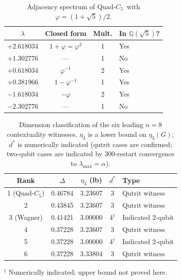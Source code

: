 \documentclass[aps,pra,twocolumn,superscriptaddress,longbibliography,floatfix]{revtex4-2}
\newcommand{\al}{\alpha}
\newcommand{\De}{\Delta}
\newcommand{\lmax}{\lambda_{\max}}
\newcommand{\QC}{\ensuremath{\text{Quad-}C_5}}
\begin{document}
\begin{table}[!ht]
  \caption{Adjacency spectrum of \QC\ with $\varphi=(1+\sqrt{5})/2$.}
  \label{tab:spectrum}
  \begin{ruledtabular}
  \scriptsize
  \begin{tabular}{rccl}
    \multicolumn{1}{c}{$\lambda$} &
    Closed form & Mult. & In $\mathbb{Q}(\sqrt{5})$? \\
    \hline
    $+2.618034$ & $1+\varphi=\varphi^2$ & 1 & Yes \\
    $+1.302776$ & ---                    & 1 & No  \\
    $+0.618034$ & $\varphi^{-1}$         & 2 & Yes \\
    $+0.381966$ & $1-\varphi^{-1}$       & 1 & Yes \\
    $-1.618034$ & $-\varphi$             & 2 & Yes \\
    $-2.302776$ & ---                    & 1 & No  \\
  \end{tabular}
  \end{ruledtabular}
\end{table}
\begin{table}[!ht]
  \caption{Dimension classification of the six leading $n=8$ contextuality
           witnesses. $\eta_3$ is a lower bound on $\eta_3(G)$; $d^*$ is
           numerically indicated (qutrit cases are confirmed; two-qubit
           cases are indicated by 300-restart convergence to $\lmax=\al$).}
  \label{tab:dim_class}
  \begin{ruledtabular}
  \scriptsize
  \begin{tabular}{crrcl}
    Rank &
    \multicolumn{1}{c}{$\De$} &
    \multicolumn{1}{c}{$\eta_3$ (lb)} &
    $d^*$ & Type \\
    \hline
    1 (\QC) & 0.46784 & 3.23607 & 3            & Qutrit witness \\
    2          & 0.43845 & 3.23607 & 3            & Qutrit witness \\
    3 (Wagner) & 0.41421 & 3.00000 & 4$^\dagger$  & Indicated 2-qubit \\
    4          & 0.37228 & 3.23607 & 3            & Qutrit witness \\
    5          & 0.37228 & 3.00000 & 4$^\dagger$  & Indicated 2-qubit \\
    6          & 0.37228 & 3.33804 & 3            & Qutrit witness \\
  \end{tabular}
  \end{ruledtabular}
  \noindent $^\dagger$ Numerically indicated; upper bound not proved here.
\end{table}
\end{document}
